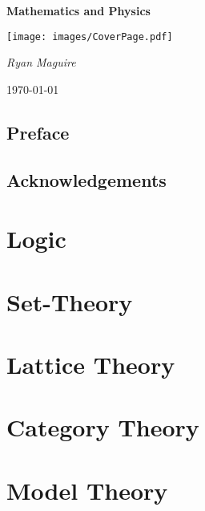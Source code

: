 \documentclass[oneside]{book}                                                  %
\newcommand*{\TOPPATH}{books}
\newcommand*{\PATH}{\TOPPATH/}
\begin{document}
    \pagecolor{CoverPage}
    \begin{titlepage}
        \centering
        {\LARGE\bfseries{Mathematics and Physics}\par}
        \vspace{3.5cm}
        \texttt{[image: images/CoverPage.pdf]}
        \par\vspace{3cm}
        {\Large\itshape{Ryan Maguire}\par}
        \vfill
        {\large\today\par}
    \end{titlepage}
    \nopagecolor
    \tableofcontents
    \listoffigures
    \listoftables
    \clearpage
    \chapter*{Preface}
        
    \clearpage
    \chapter*{Acknowledgements}
        
    \clearpage

        \label{book:Foundations}
        \renewcommand{\PATH}{\TOPPATH/Foundations}
        \part{Logic}
            
        \part{Set-Theory}
            
        \part{Lattice Theory}
            
        \part{Category Theory}
            
        \part{Model Theory}
            
    \clearpage
\end{document}
